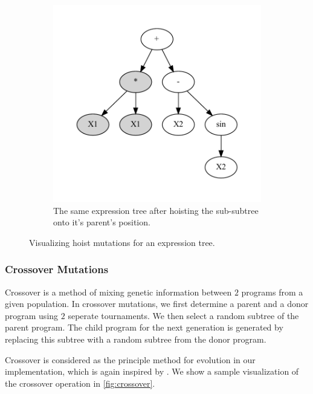 \begin{figure}[htp]
\begin{subfigure}{\textwidth}
    \includegraphics[scale=0.8]{images/graphviz/hoist_mut_after.dot.pdf}
    \caption{The same expression tree after hoisting the sub-subtree onto it's parent's position.}
    \label{fig:hoist_mutb}
  \end{subfigure}
  \caption{Visualizing hoist mutations for an expression tree. }
  
  \label{fig:hoist}
\end{figure}

\subsubsection{Crossover Mutations}
\label{subsec:crossover}
Crossover is a method of mixing genetic information between $2$ programs from a given population. In crossover mutations, we first determine a parent and a donor program using $2$ seperate tournaments. We then select a random subtree of the parent program. The child program for the next generation is generated by replacing this subtree with a random subtree from the donor program. 

Crossover is considered as the principle method for evolution in our implementation, which is again inspired by \citep{gplearn}. We show a sample visualization of the crossover operation in \cref{fig:crossover}.

